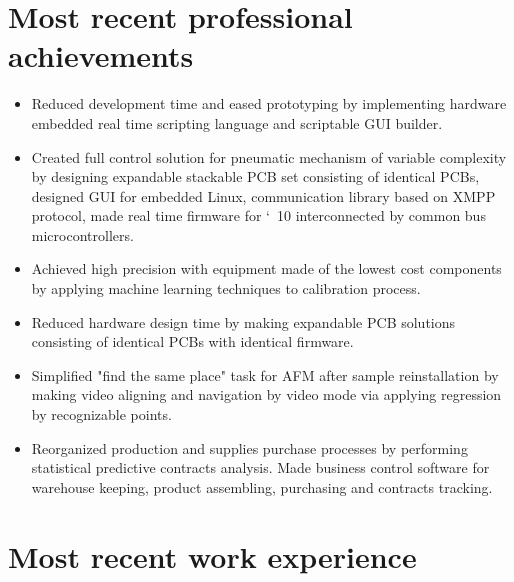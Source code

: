 \documentclass[10pt,letterpaper,oneside,sans]{moderncv}
\begin{document}
\section{Most recent professional achievements}
\begin{itemize}

\item Reduced development time and eased prototyping by implementing hardware embedded real time scripting language and scriptable GUI builder.

\item Created full control solution for pneumatic mechanism of variable complexity by designing expandable stackable PCB set consisting of identical PCBs, designed GUI for embedded Linux, communication library based on XMPP protocol, made real time firmware for \char`~10 interconnected by common bus microcontrollers.

\item Achieved high precision with equipment made of the lowest cost components by applying machine learning techniques to calibration process.

\item Reduced hardware design time by making expandable PCB solutions consisting of identical PCBs with identical firmware.

\item Simplified "find the same place" task for AFM after sample reinstallation by making video aligning and navigation by video mode via applying regression by recognizable points.

\item Reorganized production and supplies purchase processes by performing statistical predictive contracts analysis. Made business control software for warehouse keeping, product assembling, purchasing and contracts tracking.

\end{itemize}



\vspace*{-4mm}
\section{Most recent work experience}

\end{document}
